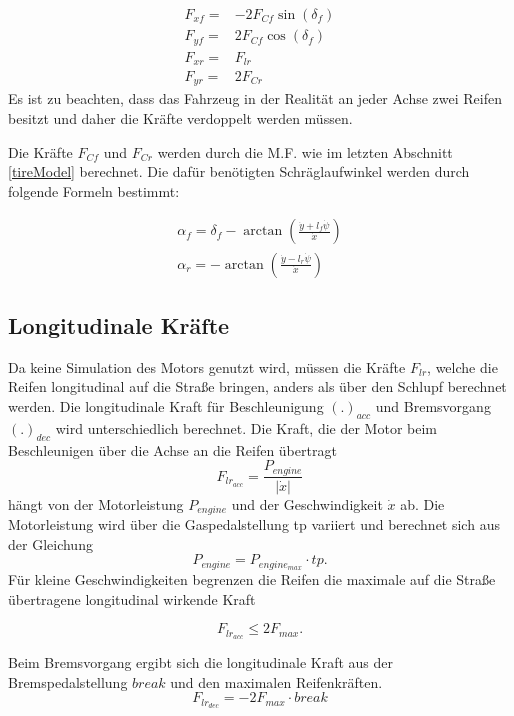 \documentclass{like}
\begin{document}
\begin{eqnarray}
F_{xf} =& - 2 F_{Cf} \sin(\delta_f) \\
F_{yf} =& 2 F_{Cf} \cos(\delta_f) \\
F_{xr} =&   F_{lr} \\
F_{yr} =& 2 F_{Cr}
\end{eqnarray}
Es ist zu beachten, dass das Fahrzeug in der Realität an jeder Achse zwei Reifen besitzt und daher die Kräfte verdoppelt werden müssen.


Die Kräfte \(F_{Cf}\) und \(F_{Cr}\) werden durch die \ac{M.F.} wie im letzten Abschnitt \ref{tireModel} berechnet.
Die dafür benötigten Schräglaufwinkel werden durch folgende Formeln bestimmt:

\begin{eqnarray}
\alpha_f = \delta_f - \arctan \left(\frac{\dot{y} + l_f \dot{\psi}}{\dot{x}} \right) \\
\alpha_r = - \arctan \left(\frac{\dot{y} - l_r \dot{\psi}}{\dot{x}} \right)
\end{eqnarray}

\subsection*{Longitudinale Kräfte}
Da keine Simulation des Motors genutzt wird, müssen die Kräfte \(F_{lr}\), welche die Reifen longitudinal auf die Straße bringen, anders als über den Schlupf berechnet werden.
Die longitudinale Kraft für Beschleunigung \((.)_{acc}\) und Bremsvorgang \((.)_{dec}\) wird unterschiedlich berechnet. Die Kraft, die der Motor beim Beschleunigen über die Achse an die Reifen übertragt
\begin{equation}
	F_{lr_{acc}} = \frac{P_{engine}}{|\dot{x}|} \label{long_dyn_engine}
\end{equation}
hängt von der Motorleistung $P_{engine}$ und der Geschwindigkeit $\dot{x}$ ab. Die Motorleistung wird über die Gaspedalstellung tp variiert und berechnet sich aus der Gleichung 
\begin{equation}
P_{engine} = P_{engine_{max}} \cdot tp.
\end{equation}
Für kleine Geschwindigkeiten begrenzen die Reifen die maximale auf die Straße übertragene longitudinal wirkende Kraft 

\begin{equation}
	F_{lr_{acc}}\leq 2 F_{max} \label{long_dyn_max}.
\end{equation}

Beim Bremsvorgang ergibt sich die longitudinale Kraft aus der Bremspedalstellung $break$ und den maximalen Reifenkräften.
\begin{equation}
F_{lr_{dec}} = - 2 F_{max} \cdot break
\end{equation} 
\end{document}
